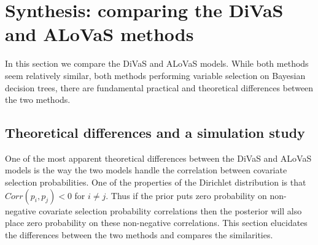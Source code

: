 \section{Synthesis: comparing the DiVaS and ALoVaS methods}
In this section we compare the DiVaS and ALoVaS models. While both methods seem relatively similar, both methods performing variable selection on Bayesian decision trees, there are fundamental practical and theoretical differences between the two methods. 

\subsection{Theoretical differences and a simulation study}

One of the most apparent theoretical differences between the DiVaS and ALoVaS models is the way the two models handle the correlation between covariate selection probabilities. One of the properties of the Dirichlet distribution is that $Corr(p_i,p_j) < 0$ for $i\neq j$. Thus if the prior puts zero probability on non-negative covariate selection probability correlations then the posterior will also place zero probability on these non-negative correlations. This section elucidates the differences between the two methods and compares the similarities. 



\begin{figure}[H]
\begin{center}
\end{center}
\end{figure}

